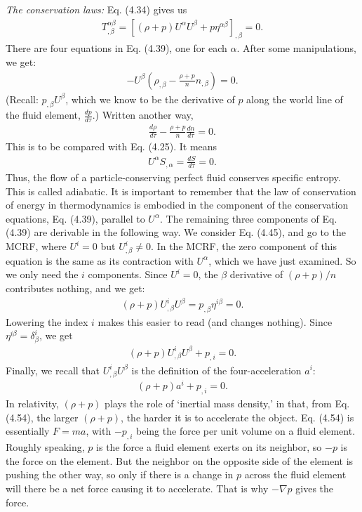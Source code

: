 \documentclass[12pt]{book}
\begin{document}
    \textit{The conservation laws:} 
    Eq. (4.34) gives us
    \begin{align}
    T^{\alpha\beta}_{,\beta} = \left[ (\rho + p) U^\alpha U^\beta + p \eta^{\alpha\beta} \right]_{,\beta} = 0. \tag{4.39}
    \end{align}
    There are four equations in Eq. (4.39), one for each \(\alpha\). After some manipulations, we get:
    \begin{align}
    - U^\beta \left( \rho_{,\beta} - \frac{\rho + p}{n} n_{,\beta} \right) = 0. \tag{4.48}
    \end{align}
    (Recall: \(p_{,\beta} U^\beta\), which we know to be the derivative of \(p\) along the world line of the fluid element, \(\frac{dp}{d\tau}\).) Written another way, 
    \begin{align}
    \frac{d \rho}{d \tau} - \frac{\rho + p}{n} \frac{d n}{d \tau} = 0. \tag{4.49}
    \end{align}
    This is to be compared with Eq. (4.25). It means
    \begin{align}
    U^\alpha S_{,\alpha} = \frac{dS}{d \tau} = 0. \tag{4.50}
    \end{align}
    Thus, the flow of a particle-conserving perfect fluid conserves specific entropy. This is called adiabatic. It is important to remember that the law of conservation of energy in thermodynamics is embodied in the component of the conservation equations, Eq. (4.39), parallel to \(U^\alpha\). The remaining three components of Eq. (4.39) are derivable in the following way. We consider Eq. (4.45), and go to the MCRF, where \(U^i = 0\) but \(U^i_{,\beta} \neq 0\). In the MCRF, the zero component of this equation is the same as its contraction with \(U^\alpha\), which we have just examined. So we only need the \(i\) components. Since \(U^i = 0\), the \(\beta\) derivative of \((\rho + p)/n\) contributes nothing, and we get:
    \begin{align}
    (\rho + p) U^i_{,\beta} U^\beta = p_{,\beta} \eta^{i\beta} = 0. \tag{4.52}
    \end{align}
    Lowering the index \(i\) makes this easier to read (and changes nothing). Since \(\eta^{i\beta} = \delta^i_\beta\), we get
    \begin{align}
    (\rho + p) U^i_{,\beta} U^\beta + p_{,i} = 0. \tag{4.53}
    \end{align}
    Finally, we recall that \(U^i_{,\beta} U^\beta\) is the definition of the four-acceleration \(a^i\):
    \begin{align}
    (\rho + p) a^i + p_{,i} = 0. \tag{4.54}
    \end{align}
    In relativity, \((\rho + p)\) plays the role of ‘inertial mass density,’ in that, from Eq. (4.54), the larger \((\rho + p)\), the harder it is to accelerate the object. Eq. (4.54) is essentially \(F = ma\), with \(-p_{,i}\) being the force per unit volume on a fluid element. Roughly speaking, \(p\) is the force a fluid element exerts on its neighbor, so \(-p\) is the force on the element. But the neighbor on the opposite side of the element is pushing the other way, so only if there is a change in \(p\) across the fluid element will there be a net force causing it to accelerate. That is why \(-\nabla p\) gives the force.
    
\end{document}
